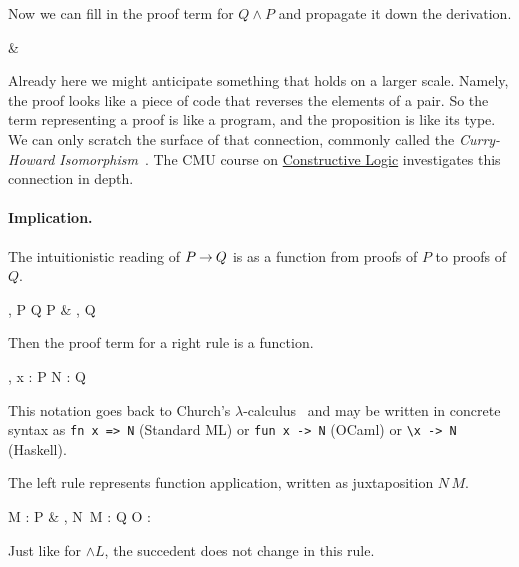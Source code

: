 \documentclass[11pt]{article}
\begin{document}
Now we can fill in the proof term for $Q \land P$ and propagate
it down the derivation.
\begin{rules}
  {
    {
      {}
      & 
      {}}}
\end{rules}
Already here we might anticipate something that holds on a larger scale.
Namely, the proof looks like a piece of code that reverses the elements of a
pair.  So the term representing a proof is like a program, and the proposition
is like its type.  We can only scratch the surface of that connection, commonly
called the \emph{Curry-Howard Isomorphism}~\citep{Curry34,Howard69}.  The CMU
course on \href{https://www.cs.cmu.edu/~fp/courses/15836-f23/}{Constructive
  Logic} investigates this connection in depth.

\paragraph{Implication.}
The intuitionistic reading of $P \mathbin{\rightarrow} Q$ is as a function from proofs of $P$
to proofs of $Q$.
\begin{rules}
  {\Gamma, P \vdash Q}
  \hspace{3em}
  {\Gamma \vdash P
    & \Gamma, Q \vdash \delta}
\end{rules}
Then the proof term for a right rule is a function.
\begin{rules}
  {\Gamma, x : P \vdash N : Q}
\end{rules}
This notation goes back to Church's $\lambda$-calculus~\citep{Church36} and may
be written in concrete syntax as \verb'fn x => N' (Standard ML) or
\verb'fun x -> N' (OCaml) or \verb'\x -> N' (Haskell).

The left rule represents function application, written as juxtaposition $N\, M$.
\begin{rules}
  {\Gamma \vdash M : P
    & \Gamma, N\, M : Q \vdash O : \delta}
\end{rules}
Just like for ${\land}L$, the succedent does not change in this rule.
\end{document}
